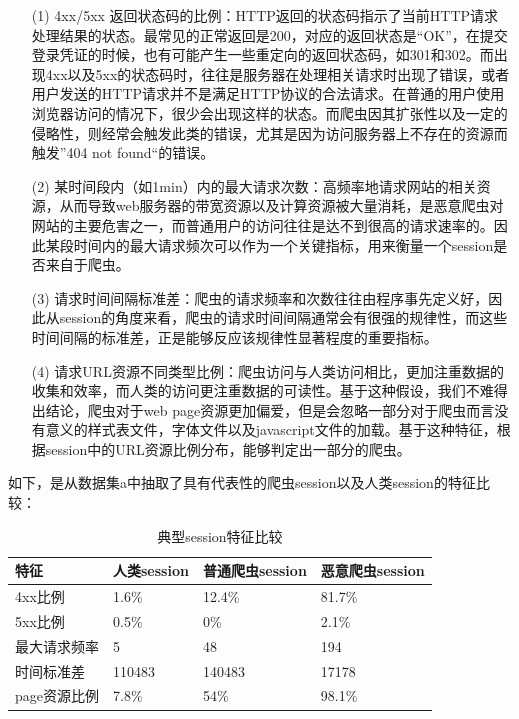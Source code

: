 \documentclass[doctor,privacy,twoside]{buaa_mac}
\begin{document}
\begin{itemize}
\item[(1)] 4xx/5xx 返回状态码的比例：HTTP返回的状态码指示了当前HTTP请求处理结果的状态。最常见的正常返回是200，对应的返回状态是“OK”，在提交登录凭证的时候，也有可能产生一些重定向的返回状态码，如301和302。而出现4xx以及5xx的状态码时，往往是服务器在处理相关请求时出现了错误，或者用户发送的HTTP请求并不是满足HTTP协议的合法请求。在普通的用户使用浏览器访问的情况下，很少会出现这样的状态。而爬虫因其扩张性以及一定的侵略性，则经常会触发此类的错误，尤其是因为访问服务器上不存在的资源而触发”404 not found“的错误。
\item[(2)] 某时间段内（如1min）内的最大请求次数：高频率地请求网站的相关资源，从而导致web服务器的带宽资源以及计算资源被大量消耗，是恶意爬虫对网站的主要危害之一，而普通用户的访问往往是达不到很高的请求速率的。因此某段时间内的最大请求频次可以作为一个关键指标，用来衡量一个session是否来自于爬虫。
\item[(3)] 请求时间间隔标准差：爬虫的请求频率和次数往往由程序事先定义好，因此从session的角度来看，爬虫的请求时间间隔通常会有很强的规律性，而这些时间间隔的标准差，正是能够反应该规律性显著程度的重要指标。
\item[(4)] 请求URL资源不同类型比例：爬虫访问与人类访问相比，更加注重数据的收集和效率，而人类的访问更注重数据的可读性。基于这种假设，我们不难得出结论，爬虫对于web page资源更加偏爱，但是会忽略一部分对于爬虫而言没有意义的样式表文件，字体文件以及javascript文件的加载。基于这种特征，根据session中的URL资源比例分布，能够判定出一部分的爬虫。
\end{itemize}

如下，是从数据集a中抽取了具有代表性的爬虫session以及人类session的特征比较：

\centerline{}
\begin{table}[h]
  \caption{典型session特征比较}
  \label{tab:papercomponents}
  \centering
\begin{tabular}{|p{3cm}<{\centering}||p{3cm}<{\centering}|p{3cm}<{\centering}|p{3cm}<{\centering}|}
    \hline
   特征 & 人类session & 普通爬虫session & 恶意爬虫session    \\
    \hline
4xx比例 & 1.6\% & 12.4\%  & 81.7\% \\
\hline
5xx比例 & 0.5\% & 0\% & 2.1\% \\
\hline
最大请求频率 & 5 & 48 & 194 \\
\hline
时间标准差 & 110483 & 140483 & 17178 \\
\hline
page资源比例 & 7.8\% & 54\% & 98.1\% \\

\hline
    \end{tabular}
\end{table}
\centerline{}
\end{document}
